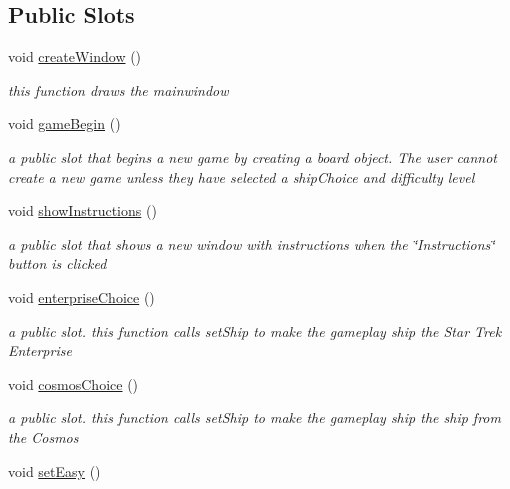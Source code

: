 \subsection*{Public Slots}
\begin{DoxyCompactItemize}
\item 
\hypertarget{class_main_window_a490dffeed0087613db6d8670e2e449fd}{}void \hyperlink{class_main_window_a490dffeed0087613db6d8670e2e449fd}{create\+Window} ()\label{class_main_window_a490dffeed0087613db6d8670e2e449fd}

\begin{DoxyCompactList}\small\item\em this function draws the mainwindow \end{DoxyCompactList}\item 
void \hyperlink{class_main_window_a50c46a9bcecd6984843fa3ac18de5ca6}{game\+Begin} ()
\begin{DoxyCompactList}\small\item\em a public slot that begins a new game by creating a board object. The user cannot create a new game unless they have selected a ship\+Choice and difficulty level \end{DoxyCompactList}\item 
void \hyperlink{class_main_window_a146223deb707bcec634698b1bc4c09d4}{show\+Instructions} ()
\begin{DoxyCompactList}\small\item\em a public slot that shows a new window with instructions when the \char`\"{}\+Instructions\char`\"{} button is clicked \end{DoxyCompactList}\item 
void \hyperlink{class_main_window_a64e01e49613213839210832983620eb2}{enterprise\+Choice} ()
\begin{DoxyCompactList}\small\item\em a public slot. this function calls set\+Ship to make the gameplay ship the Star Trek Enterprise \end{DoxyCompactList}\item 
void \hyperlink{class_main_window_aa240ae1f2d456d91a74000eafe5fb8b0}{cosmos\+Choice} ()
\begin{DoxyCompactList}\small\item\em a public slot. this function calls set\+Ship to make the gameplay ship the ship from the Cosmos \end{DoxyCompactList}\item 
void \hyperlink{class_main_window_a9840f393bbd7e84daeab6d10214b10d0}{set\+Easy} ()

\end{DoxyCompactItemize}
